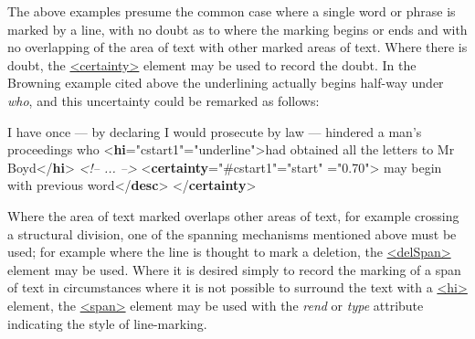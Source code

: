 The above examples presume the common case where a single word or phrase is marked by a line, with no doubt as to where the marking begins or ends and with no overlapping of the area of text with other marked areas of text. Where there is doubt, the \hyperref[TEI.certainty]{<certainty>} element may be used to record the doubt. In the Browning example cited above the underlining actually begins half-way under \textit{who}, and this uncertainty could be remarked as follows: \par\bgroup{}\exampleFont \begin{shaded}\noindent\mbox{}I have once — by declaring I would prosecute\mbox{}\newline 
 by law — hindered a man's proceedings who {<\textbf{hi}\hspace*{1em}{xml:id}="{cstart1}"\hspace*{1em}{rend}="{underline}">}had\mbox{}\newline 
 obtained all the letters to Mr Boyd{</\textbf{hi}>}\mbox{}\newline 
\textit{<!-- ... -->}\mbox{}\newline 
{<\textbf{certainty}\hspace*{1em}{target}="{\#cstart1}"\hspace*{1em}{locus}="{start}"\mbox{}\newline 
\hspace*{1em}{degree}="{0.70}">}\mbox{}\newline 
{}may begin with previous word{</\textbf{desc}>}\mbox{}\newline 
{</\textbf{certainty}>}\end{shaded}\egroup\par \par
Where the area of text marked overlaps other areas of text, for example crossing a structural division, one of the spanning mechanisms mentioned above must be used; for example where the line is thought to mark a deletion, the \hyperref[TEI.delSpan]{<delSpan>} element may be used. Where it is desired simply to record the marking of a span of text in circumstances where it is not possible to surround the text with a \hyperref[TEI.hi]{<hi>} element, the \hyperref[TEI.span]{<span>} element may be used with the {\itshape rend} or {\itshape type} attribute indicating the style of line-marking.\par

